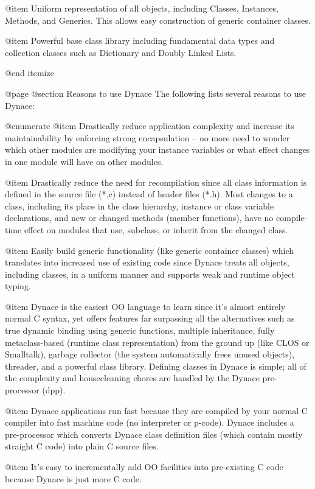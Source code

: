 @item Uniform representation of all objects, including Classes, Instances,
Methods, and Generics.  This allows easy construction of generic container
classes.

@item Powerful base class library including fundamental data types and
collection classes such as Dictionary and Doubly Linked Lists.

@end itemize


@page
@section Reasons to use Dynace
The following lists several reasons to use Dynace:

@enumerate
@item
Drastically reduce application complexity and increase its
maintainability by enforcing strong encapsulation -- no more need to
wonder which other modules are modifying your instance variables or
what effect changes in one module will have on other modules.

@item
Drastically reduce the need for recompilation since all class information
is defined in the source file (*.c) instead of header files (*.h).  Most
changes to a class, including its place in the class hierarchy, instance
or class variable declarations, and new or changed methods (member functions),
have no compile-time effect on modules that use, subclass, or inherit 
from the changed class.

@item
Easily build generic functionality (like generic container classes)
which translates into increased use of existing code since Dynace
treats all objects, including classes, in a uniform manner and supports
weak and runtime object typing.

@item
Dynace is the easiest OO language to learn since it's almost entirely
normal C syntax, yet offers features far surpassing all the alternatives
such as true dynamic binding using generic functions, multiple inheritance,
fully metaclass-based (runtime class representation) from the ground up
(like CLOS or Smalltalk), garbage collector (the system automatically frees
unused objects), threader, and a powerful class library.  Defining classes
in Dynace is simple; all of the complexity and housecleaning chores are
handled by the Dynace pre-processor (dpp).

@item
Dynace applications run fast because they are compiled by your normal
C compiler into fast machine code (no interpreter or p-code).  Dynace
includes a pre-processor which converts Dynace class definition files
(which contain mostly straight C code) into plain C source files.

@item
It's easy to incrementally add OO facilities into pre-existing C code
because Dynace is just more C code.

